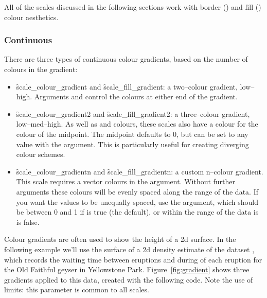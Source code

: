 All of the scales discussed in the following sections work with border () and fill () colour aesthetics.


\subsubsection{Continuous}
\label{ssub:colour-continuous}

There are three types of continuous colour gradients, based on the number of colours in the gradient: 

\begin{itemize}
  \item \f{scale_colour_gradient} and \f{scale_fill_gradient}: a two--colour gradient, low--high.  Arguments  and  control the colours at either end of the gradient.

  \item \f{scale_colour_gradient2} and \f{scale_fill_gradient2}: a three--colour gradient, low--med--high.  As well as  and  colours, these scales also have a  colour for the colour of the midpoint.  The midpoint defaults to 0, but can be set to any value with the  argument.  This is particularly useful for creating diverging colour schemes.

  \item \f{scale_colour_gradientn} and \f{scale_fill_gradientn}: a custom n--colour gradient.  This scale requires a vector colours in the  argument.  Without further arguments these colours will be evenly spaced along the range of the data.  If you want the values to be unequally spaced, use the  argument, which should be between 0 and 1 if  is true (the default), or within the range of the data is  is false.
\end{itemize}

Colour gradients are often used to show the height of a 2d surface.  In the following example we'll use the surface of a 2d density estimate of the  dataset \citep{azzalini:1990}, which records the waiting time between eruptions and during of each eruption for the Old Faithful geyser in Yellowstone Park. Figure~\ref{fig:gradient} shows three gradients applied to this data, created with the following code.  Note the use of limits: this parameter is common to all scales.

